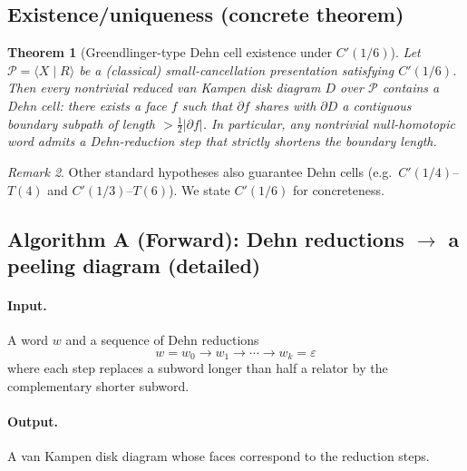 \documentclass[11pt]{article}
\newtheorem{theorem}{Theorem}[section]
\theoremstyle{definition}
\theoremstyle{plain}
\theoremstyle{remark}
\newtheorem{remark}[theorem]{Remark}
\begin{document}
\subsection*{Existence/uniqueness (concrete theorem)}
\begin{theorem}[Greendlinger-type Dehn cell existence under $C'(1/6)$]\label{thm:greendlinger}
Let $\mathcal P=\langle X\mid R\rangle$ be a (classical) small-cancellation presentation satisfying $C'(1/6)$.
Then every nontrivial reduced van Kampen disk diagram $D$ over $\mathcal P$ contains a Dehn cell:
there exists a face $f$ such that $\partial f$ shares with $\partial D$ a contiguous boundary subpath of length $>\tfrac12|\partial f|$.
In particular, any nontrivial null-homotopic word admits a Dehn-reduction step that strictly shortens the boundary length.
\end{theorem}

\begin{remark}
Other standard hypotheses also guarantee Dehn cells (e.g.\ $C'(1/4)$--$T(4)$ and $C'(1/3)$--$T(6)$).
We state $C'(1/6)$ for concreteness.
\end{remark}

\subsection*{Algorithm A (Forward): Dehn reductions $\to$ a peeling diagram (detailed)}\cite{dehn1911,greendlinger1960,lyndonschupp1977}
\paragraph{Input.}
A word $w$ and a sequence of Dehn reductions
\[
w=w_0\to w_1\to\cdots\to w_k=\varepsilon
\]
where each step replaces a subword longer than half a relator by the complementary shorter subword.

\paragraph{Output.} A van Kampen disk diagram whose faces correspond to the reduction steps.
\end{document}
